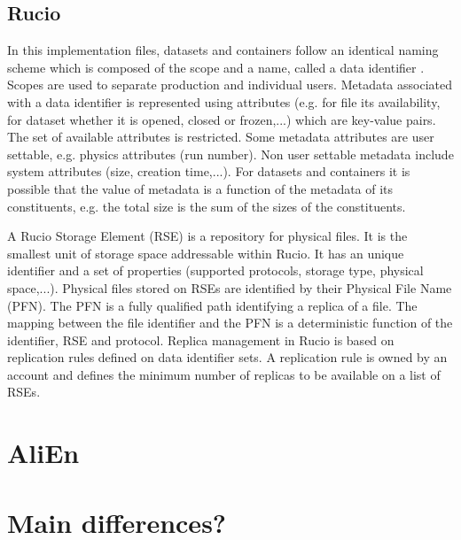 \subsection{Rucio}
In this implementation files, datasets and containers follow an identical naming scheme which is composed of the
scope and a name, called a data identifier \cite{ATLAS-Rucio}. Scopes are used to separate production and individual
users. Metadata associated with a data identifier is represented using attributes (e.g. for file its availability,
for dataset whether it is opened, closed or frozen,...) which are key-value pairs. The set of available attributes 
is restricted. Some metadata attributes are user settable, e.g. physics attributes (run number). Non user settable 
metadata include system attributes (size, creation time,...). For datasets and containers it is possible that the 
value of metadata is a function of the metadata of its constituents, e.g. the total size is the sum of the
sizes of the constituents.

A Rucio Storage Element (RSE) is a repository for physical files. It is the smallest unit of
storage space addressable within Rucio. It has an unique identifier and a set of properties (supported protocols,
storage type, physical space,...). Physical files stored on RSEs are identified by their Physical File Name (PFN).
The PFN is a fully qualified path identifying a replica of a file. The mapping between the file identifier and
the PFN is a deterministic function of the identifier, RSE and protocol. Replica management in Rucio is based on
replication rules defined on data identifier sets. A replication rule is owned by an account and defines the 
minimum number of replicas to be available on a list of RSEs.

\section{AliEn}


\section{Main differences?}